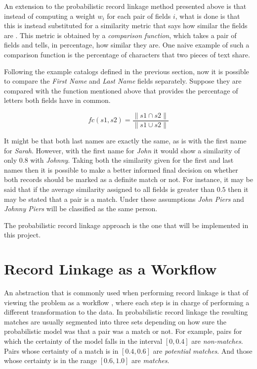 \documentclass[epsfig,a4paper,11pt,titlepage,twoside,openany]{book}
\begin{document}
An extension to the probabilistic record linkage method presented above is that instead of computing a weight $w_i$ for each pair of fields $i$, what is done is that this is instead substituted for a similarity metric that says how similar the fields are \cite{porter1997approximate,winkler1990string}. This metric is obtained by a \textit{comparison function}, which takes a pair of fields and tells, in percentage, how similar they are. One naive example of such a comparison function is the percentage of characters that two pieces of text share.

Following the example catalogs defined in the previous section, now it is possible to compare the \textit{First Name} and \textit{Last Name} fields separately. Suppose they are compared with the function mentioned above that provides the percentage of letters both fields have in common.

$$
fc(s1, s2) = \frac{\| s1 \cap s2 \|}{\| s1 \cup s2 \|}
$$

It might be that both last names are exactly the same, as is with the first name for \textit{Sarah}. However, with the first name for \textit{John} it would show a similarity of only $0.8$ with \textit{Johnny}. Taking both the similarity given for the first and last names then it is possible to make a better informed final decision on whether both records should be marked as a definite match or not.  For instance, it may be said that if the average similarity assigned to all fields is greater than $0.5$ then it may be stated that a pair is a match. Under these assumptions \textit{John Piers} and \textit{Johnny Piers} will be classified as the same person.

The probabilistic record linkage approach is the one that will be implemented in this project.



\section{Record Linkage as a Workflow}
\label{sec:rl-as-a-workflow}

An abstraction that is commonly used when performing record linkage is that of viewing the problem as a workflow \cite{christen12_data}, where each step is in charge of performing a different transformation to the data. In probabilistic record linkage \cite{fellegi69_theor_recor_linkag} the resulting matches are usually segmented into three sets depending on how sure the probabilistic model was that a pair was a match or not. For example, pairs for which the certainty of the model falls in the interval $[0, 0.4]$ are \textit{non-matches}. Pairs whose certainty of a match is in $[0.4, 0.6]$ are \textit{potential matches}. And those whose certainty is in the range $[0.6, 1.0]$ are \textit{matches}.
\end{document}
